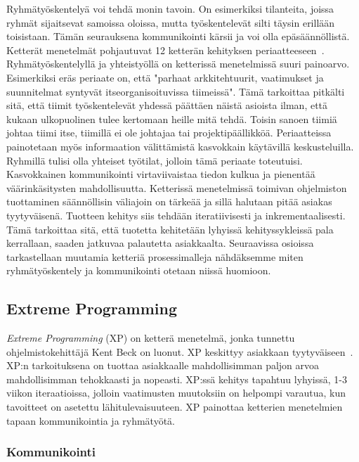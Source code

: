 \documentclass[finnish]{../tktltiki2}
\theoremstyle{definition}
\theoremstyle{remark}
\begin{document}
Ryhmätyöskentelyä voi tehdä monin tavoin. On esimerkiksi tilanteita, 
joissa ryhmät sijaitsevat samoissa oloissa, mutta työskentelevät silti 
täysin erillään toisistaan. Tämän seurauksena kommunikointi kärsii ja 
voi olla epäsäännöllistä. Ketterät menetelmät pohjautuvat 12 ketterän 
kehityksen periaatteeseen~\cite{AgileManifesto}. Ryhmätyöskentelyllä 
ja yhteistyöllä on ketterissä
menetelmissä suuri painoarvo. Esimerkiksi eräs periaate on, että 
"parhaat arkkitehtuurit, vaatimukset ja suunnitelmat syntyvät 
itseorganisoituvissa
tiimeissä". Tämä tarkoittaa pitkälti sitä, että tiimit työskentelevät 
yhdessä päättäen näistä asioista ilman, että kukaan ulkopuolinen tulee
kertomaan heille mitä tehdä. Toisin sanoen tiimiä johtaa tiimi itse, 
tiimillä ei ole johtajaa tai projektipäällikköä. Periaatteissa 
painotetaan
myös informaation välittämistä kasvokkain käytävillä keskusteluilla. 
Ryhmillä tulisi olla yhteiset työtilat, jolloin tämä periaate 
toteutuisi.
Kasvokkainen kommunikointi virtaviivaistaa tiedon kulkua ja pienentää 
väärinkäsitysten mahdollisuutta.
Ketterissä menetelmissä toimivan ohjelmiston tuottaminen säännöllisin 
väliajoin on tärkeää ja sillä halutaan pitää asiakas tyytyväisenä.
Tuotteen kehitys siis tehdään iteratiivisesti ja inkrementaalisesti. 
Tämä tarkoittaa sitä, että tuotetta kehitetään lyhyissä 
kehityssykleissä pala kerrallaan, saaden jatkuvaa palautetta 
asiakkaalta. Seuraavissa osioissa tarkastellaan muutamia ketteriä 
prosessimalleja nähdäksemme miten ryhmätyöskentely ja kommunikointi 
otetaan niissä huomioon.

\subsection{Extreme Programming}

\emph{Extreme Programming} (XP) on ketterä menetelmä, jonka tunnettu 
ohjelmistokehittäjä Kent Beck on luonut. XP keskittyy asiakkaan tyytyväiseen~\cite{XP.ORG}. XP:n tarkoituksena on tuottaa 
asiakkaalle mahdollisimman paljon arvoa mahdollisimman tehokkaasti ja nopeasti.
XP:ssä kehitys tapahtuu lyhyissä, 1-3 viikon iteraatioissa, jolloin vaatimusten 
muutoksiin on helpompi varautua, kun tavoitteet on asetettu 
lähitulevaisuuteen. XP painottaa ketterien menetelmien tapaan kommunikointia ja ryhmätyötä.

\subsubsection{Kommunikointi}
\end{document}
